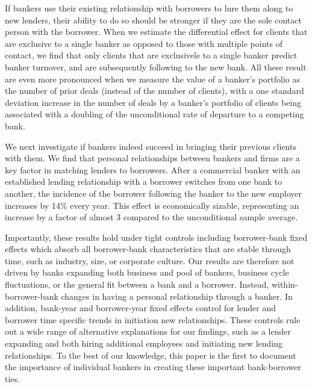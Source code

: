 If bankers use their existing relationship with borrowers to lure them along to new lenders, their ability to do so should be stronger if they are the sole contact person with the borrower. When we estimate the differential effect for clients that are exclusive to a single banker as opposed to those with multiple points of contact, we find that only clients that are exclusivele to a single banker predict banker turnover, and are subsequently following to the new bank. All these result are even more pronounced when we measure the value of a banker's portfolio as the number of prior deals (instead of the number of clients), with a one standard deviation increase in the number of deals by a banker's portfolio of clients being associated with a doubling of the unconditional rate of departure to a competing bank. %

We next investigate if bankers indeed succeed in bringing their previous clients with them. We find that personal relationships between bankers and firms are a key factor in matching lenders to borrowers. After a commercial banker with an established lending relationship with a borrower switches from one bank to another, the incidence of the borrower following the banker to the new employer increases by 14\% every year. This effect is economically sizable, representing an increase by a factor of almost 3 compared to the unconditional sample average. %


Importantly, these results hold under tight controls including borrower-bank fixed effects which absorb all borrower-bank characteristics that are stable through time, such as industry, size, or corporate culture. Our results are therefore not driven by banks expanding both business and pool of bankers, business cycle fluctuations, or the general fit between a bank and a borrower. Instead, within-borrower-bank changes in having a personal relationship through a banker. In addition, bank-year and borrower-year fixed effects control for lender and borrower time specific trends in initiation new relationships. These controls rule out a wide range of alternative explanations for our findings, such as a lender expanding and both hiring additional employees and initiating new lending relationships. To the best of our knowledge, this paper is the first to document the importance of individual bankers in creating these important bank-borrower ties. 

